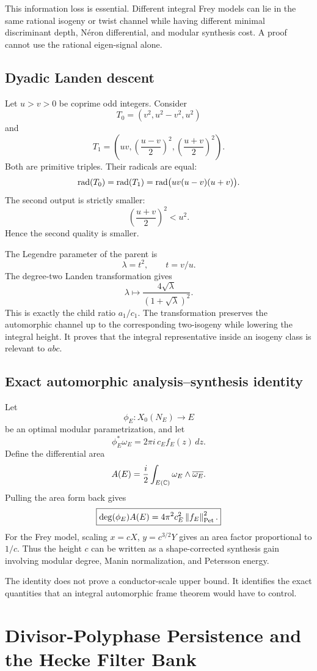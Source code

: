 This information loss is essential. Different integral Frey models can lie in the same rational isogeny or twist channel while having different minimal discriminant depth, N\'eron differential, and modular synthesis cost. A proof cannot use the rational eigen-signal alone.

\section{Dyadic Landen descent}
Let $u>v>0$ be coprime odd integers. Consider
\[
 T_0=(v^2,u^2-v^2,u^2)
\]
and
\[
 T_1=
 \left(
 uv,
 \left(\frac{u-v}{2}\right)^2,
 \left(\frac{u+v}{2}\right)^2
 \right).
\]
Both are primitive triples. Their radicals are equal:
\[
 \operatorname{rad}(T_0)=\operatorname{rad}(T_1)=\operatorname{rad}\bigl(uv(u-v)(u+v)\bigr).
\]
The second output is strictly smaller:
\[
 \left(\frac{u+v}{2}\right)^2<u^2.
\]
Hence the second quality is smaller.

The Legendre parameter of the parent is
\[
 \lambda=t^2,
 \qquad
 t=v/u.
\]
The degree-two Landen transformation gives
\[
 \boxed{
 \lambda
 \longmapsto
 \frac{4\sqrt\lambda}{(1+\sqrt\lambda)^2}.
 }
\]
This is exactly the child ratio $a_1/c_1$. The transformation preserves the automorphic channel up to the corresponding two-isogeny while lowering the integral height. It proves that the integral representative inside an isogeny class is relevant to $abc$.

\section{Exact automorphic analysis--synthesis identity}
Let
\[
 \phi_E:X_0(N_E)\longrightarrow E
\]
be an optimal modular parametrization, and let
\[
 \phi_E^*\omega_E
 =
 2\pi i\,c_E f_E(z)\,dz.
\]
Define the differential area
\[
 A(E)
 =
 \frac{i}{2}
 \int_{E(\mathbb C)}
 \omega_E\wedge\overline{\omega_E}.
\]
Pulling the area form back gives
\[
 \boxed{
 \deg(\phi_E)A(E)
 =
 4\pi^2 c_E^2
 \left\lVert f_E\right\rVert_{\mathrm{Pet}}^2.
 }
\]
For the Frey model, scaling $x=cX$, $y=c^{3/2}Y$ gives an area factor proportional to $1/c$. Thus the height $c$ can be written as a shape-corrected synthesis gain involving modular degree, Manin normalization, and Petersson energy.

The identity does not prove a conductor-scale upper bound. It identifies the exact quantities that an integral automorphic frame theorem would have to control.

\chapter{Divisor-Polyphase Persistence and the Hecke Filter Bank}

